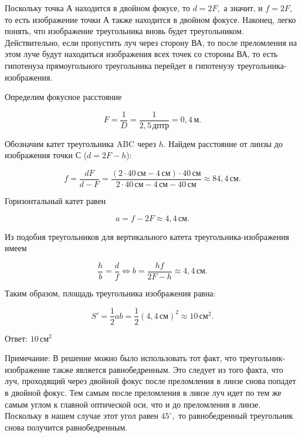 \documentclass[12pt,a4paper]{article}
\begin{document}
{Поскольку точка А находится в двойном фокусе, то $d=2F,$ а значит, и $f=2F,$ то есть изображение точки А также находится в двойном фокусе.
Наконец, легко понять, что изображение треугольника вновь будет треугольником. Действительно, если пропустить луч через сторону ВА, то после преломления на этом луче будут находиться изображения всех точек со стороны ВА, то есть гипотенуза прямоугольного треугольника перейдет в гипотенузу треугольника-изображения.

Определим фокусное расстояние

\[F= \frac{1}{D} = \frac{1}{2{,}5\,\text{дптр}} =0{,}4\,\text{м}.\]

Обозначим катет треугольника ABC через $h.$
Найдем расстояние от линзы до изображения точки С ($d=2F - h$):

\[f= \frac{dF}{d - F} = \frac{( 2 \cdot 40 \,\text{см} - 4\,\text{см} ) \cdot 40\,\text{см}}{2 \cdot 40 \,\text{см} - 4\,\text{см} - 40\,\text{см}} \approx 84{,}4\,\text{см}.\]

Горизонтальный катет равен 

\[a=f - 2F\approx 4{,}4\,\text{см}.\]

Из подобия треугольников для вертикального катета треугольника-изображения имеем

\[\frac{h}{b} = \frac{d}{f} \Longleftrightarrow b= \frac{hf}{2F - h} \approx 4{,}4 \,\text{см}.\]

Таким образом, площадь треугольника изображения равна: 

\[S' = \frac{1}{2} ab = \frac{1}{2} ( 4{,}4\,\text{см} ) ^2 \approx 10\,\text{см} ^2 .\]

Ответ: $10\,\text{см} ^2$

Примечание:
В решение можно было использовать тот факт, что треугольник-изображение также является равнобедренным. Это следует из того факта, что луч, проходящий через двойной фокус после преломления в линзе снова попадет в двойной фокус. Тем самым после преломления в линзе луч идет по тем же самым углом к главной оптической оси, что и до преломления в линзе. Поскольку в нашем случае этот угол равен $45 ^\circ,$ то равнобедренный треугольник снова получится равнобедренным.
}
\end{document}
